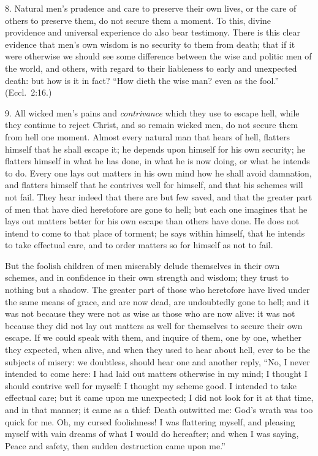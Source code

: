 \documentclass[
]{book}
\begin{document}
8. Natural men's prudence and care to preserve their own lives, or the care of others to preserve them, do not secure them a moment. To this, divine providence and universal experience do also bear testimony. There is this clear evidence that men's own wisdom is no security to them from death; that if it were otherwise we should see some difference between the wise and politic men of the world, and others, with regard to their liableness to early and unexpected death: but how is it in fact? ``How dieth the wise man? even as the fool.'' (Eccl.~2:16.)

9. All wicked men's pains and \emph{contrivance} which they use to escape hell, while they continue to reject Christ, and so remain wicked men, do not secure them from hell one moment. Almost every natural man that hears of hell, flatters himself that he shall escape it; he depends upon himself for his own security; he flatters himself in what he has done, in what he is now doing, or what he intends to do. Every one lays out matters in his own mind how he shall avoid damnation, and flatters himself that he contrives well for himself, and that his schemes will not fail. They hear indeed that there are but few saved, and that the greater part of men that have died heretofore are gone to hell; but each one imagines that he lays out matters better for his own escape than others have done. He does not intend to come to that place of torment; he says within himself, that he intends to take effectual care, and to order matters so for himself as not to fail.

But the foolish children of men miserably delude themselves in their own schemes, and in confidence in their own strength and wisdom; they trust to nothing but a shadow. The greater part of those who heretofore have lived under the same means of grace, and are now dead, are undoubtedly gone to hell; and it was not because they were not as wise as those who are now alive: it was not because they did not lay out matters as well for themselves to secure their own escape. If we could speak with them, and inquire of them, one by one, whether they expected, when alive, and when they used to hear about hell, ever to be the subjects of misery: we doubtless, should hear one and another reply, ``No, I never intended to come here: I had laid out matters otherwise in my mind; I thought I should contrive well for myself: I thought my scheme good. I intended to take effectual care; but it came upon me unexpected; I did not look for it at that time, and in that manner; it came as a thief: Death outwitted me: God's wrath was too quick for me. Oh, my cursed foolishness! I was flattering myself, and pleasing myself with vain dreams of what I would do hereafter; and when I was saying, Peace and safety, then sudden destruction came upon me.''
\end{document}

